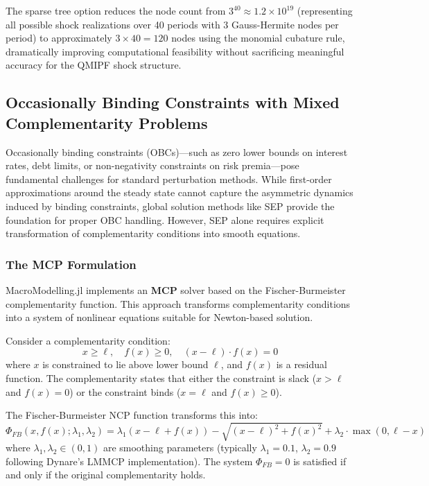 \documentclass[12pt]{article}
\begin{document}
The sparse tree option reduces the node count from $3^{40} \approx 1.2 \times 10^{19}$ (representing all possible shock realizations over 40 periods with 3 Gauss-Hermite nodes per period) to approximately $3 \times 40 = 120$ nodes using the monomial cubature rule, dramatically improving computational feasibility without sacrificing meaningful accuracy for the QMIPF shock structure.

\subsection{Occasionally Binding Constraints with Mixed Complementarity Problems}\label{sec:mcp}

Occasionally binding constraints (OBCs)---such as zero lower bounds on interest rates, debt limits, or non-negativity constraints on risk premia---pose fundamental challenges for standard perturbation methods. While first-order approximations around the steady state cannot capture the asymmetric dynamics induced by binding constraints, global solution methods like SEP provide the foundation for proper OBC handling. However, SEP alone requires explicit transformation of complementarity conditions into smooth equations.

\subsubsection{The MCP Formulation}

MacroModelling.jl implements an \textbf{MCP} solver based on the Fischer-Burmeister complementarity function. This approach transforms complementarity conditions into a system of nonlinear equations suitable for Newton-based solution.

Consider a complementarity condition:
\[
x \geq \ell, \quad f(x) \geq 0, \quad (x - \ell) \cdot f(x) = 0
\]
where $x$ is constrained to lie above lower bound $\ell$, and $f(x)$ is a residual function. The complementarity states that either the constraint is slack ($x > \ell$ and $f(x) = 0$) or the constraint binds ($x = \ell$ and $f(x) \geq 0$).

The Fischer-Burmeister NCP function transforms this into:
\[
\Phi_{FB}(x, f(x); \lambda_1, \lambda_2) = \lambda_1(x - \ell + f(x)) - \sqrt{(x - \ell)^2 + f(x)^2} + \lambda_2 \cdot \max(0, \ell - x)
\]
where $\lambda_1, \lambda_2 \in (0,1)$ are smoothing parameters (typically $\lambda_1 = 0.1$, $\lambda_2 = 0.9$ following Dynare's LMMCP implementation). The system $\Phi_{FB} = 0$ is satisfied if and only if the original complementarity holds.
\end{document}
